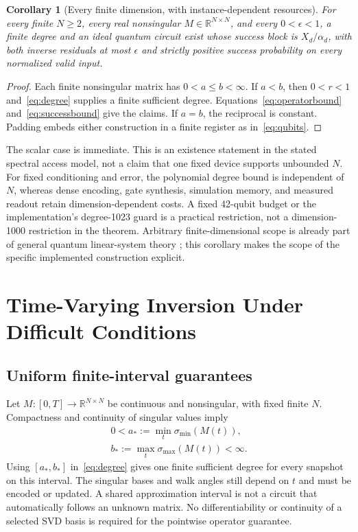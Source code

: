 \documentclass[journal]{IEEEtran}
\newtheorem{corollary}{Corollary}
\newcommand{\R}{\mathbb{R}}
\begin{document}
\begin{corollary}[Every finite dimension, with instance-dependent resources]
For every finite $N\geq2$, every real nonsingular $M\in\R^{N\times N}$,
and every $0<\epsilon<1$, a finite degree and an ideal quantum circuit
exist whose success block is $X_d/\alpha_d$, with both inverse residuals
at most $\epsilon$ and strictly positive success probability on every
normalized valid input.
\end{corollary}
\begin{proof}
Each finite nonsingular matrix has $0<a\leq b<\infty$. If $a<b$, then
$0<r<1$ and~\eqref{eq:degree} supplies a finite sufficient degree.
Equations~\eqref{eq:operatorbound} and~\eqref{eq:successbound} give the
claims. If $a=b$, the reciprocal is constant. Padding embeds either
construction in a finite register as in~\eqref{eq:qubits}.
\end{proof}
The scalar case is immediate. This is an existence statement in the
stated spectral access model, not a claim that one fixed device supports
unbounded $N$. For fixed conditioning and error, the polynomial degree
bound is independent of $N$, whereas dense encoding, gate synthesis,
simulation memory, and measured readout retain dimension-dependent costs.
A fixed 42-qubit budget or the implementation's degree-1023 guard is a
practical restriction, not a dimension-1000 restriction in the theorem.
Arbitrary finite-dimensional scope is already part of general quantum
linear-system theory \cite{harrow2009,childs2017,gilyen2019}; this corollary
makes the scope of the specific implemented construction explicit.

\section{Time-Varying Inversion Under Difficult Conditions}
\label{sec:temporal}
\subsection{Uniform finite-interval guarantees}
Let $M:[0,T]\to\R^{N\times N}$ be continuous and nonsingular, with fixed
finite $N$. Compactness and continuity of singular values imply
\begin{equation}
 \begin{gathered}
 0<a_*:=\min_t\sigma_{\min}(M(t)),\\
 b_*:=\max_t\sigma_{\max}(M(t))<\infty.
 \end{gathered}
 \label{eq:uniformgap}
\end{equation}
Using $[a_*,b_*]$ in~\eqref{eq:degree} gives one finite sufficient degree
for every snapshot on this interval. The singular bases and walk angles
still depend on $t$ and must be encoded or updated. A shared approximation
interval is not a circuit that automatically follows an unknown matrix.
No differentiability or continuity of a selected SVD basis is required
for the pointwise operator guarantee.
\end{document}
